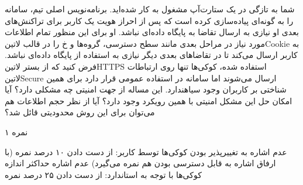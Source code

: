 \documentclass[../main.tex]{subfiles}
\begin{document}

شما به تازگی در یک ستارت‌آپ مشغول به کار شده‌اید.
برنامه‌نویس اصلی تیم، سامانه را به گونه‌ای پیاده‌سازی کرده است که پس از احراز هویت یک کاربر
برای تراکنش‌های بعدی او نیازی به ارسال تقاضا به پایگاه داده‌ای نباشد.
او برای این منظور تمام اطلاعات مورد نیاز در مراحل بعدی مانند سطح دسترسی، گروه‌ها و ‌خ را در قالب ‌لاتین{Cookie}
به کاربر ارسال می‌کند تا در تقاضاهای بعدی دیگر نیازی به استفاده از پایگاه داده‌ای نباشد.
فرض کنید که از بستر ‌لاتین{HTTPS} استفاده شده، کوکی‌ها تنها روی ارتباطات  لاتین{Secure} ارسال می‌شوند اما سامانه در استفاده عمومی قرار دارد برای همین شناختی بر کاربران وجود ‌سیاه{ندارد}.
این مساله از جهت امنیتی چه مشکلی دارد؟ آیا امکان حل این مشکل امنیتی با همین رویکرد وجود دارد؟
آیا از نظر حجم اطلاعات هم می‌توان برای این روش محدودیتی قائل شد؟

۱ نمره

\begin{answer}
 عدم اشاره به تغییرپذیر بودن کوکی‌ها توسط کاربر: از دست دادن ۱۰ درصد نمره (با ارفاق اشاره به قابل دسترسی بودن هم نمره می‌گیرد)
 عدم اشاره حداکثر اندازه کوکی‌ها با توجه به استاندارد: از دست دادن ۲۵ درصد نمره
\end{answer}
\end{document}
